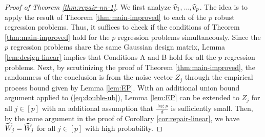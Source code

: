 \begin{proof}[Proof of Theorem \ref{thm:repair-nn-1}]
We first analyze $\widehat{v}_1,...,\widehat{v}_p$. The idea is to apply the result of Theorem \ref{thm:main-improved} to each of the $p$ robust regression problems. Thus, it suffices to check if the conditions of Theorem \ref{thm:main-improved} hold for the $p$ regression problems simultaneously. Since the $p$ regression problems share the same Gaussian design matrix, Lemma \ref{lem:design-linear} implies that Conditions A and B hold for all the $p$ regression problems. Next, by scrutinizing the proof of Theorem \ref{thm:main-improved}, the randomness of the conclusion is from the noise vector $Z_j$ through the empirical process bound given by Lemma \ref{lem:EP}. With an additional union bound argument applied to (\ref{eq:double-ub}), Lemma \ref{lem:EP} can be extended to $Z_j$ for all $j\in[p]$ with an additional assumption that $\frac{\log p}{d}$ is sufficiently small. Then, by the same argument in the proof of Corollary \ref{cor:repair-linear}, we have $\widetilde{W}_j=\widehat{W}_j$ for all $j\in[p]$ with high probability.


\end{proof}
